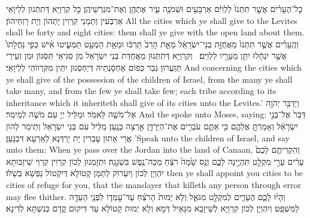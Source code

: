 {כׇּל־הֶעָרִ֗ים אֲשֶׁ֤ר תִּתְּנוּ֙ לַלְוִיִּ֔ם אַרְבָּעִ֥ים וּשְׁמֹנֶ֖ה עִ֑יר אֶתְהֶ֖ן וְאֶת־מִגְרְשֵׁיהֶֽן׃}
{כָּל קִרְוַיָּא דְּתִתְּנוּן לְלֵיוָאֵי אַרְבְּעִין וְתַמְנֵי קִרְוִין יָתְהוֹן וְיָת רַוְחֵיהוֹן׃}
{All the cities which ye shall give to the Levites shall be forty and eight cities: them shall ye give with the open land about them.}{}
{וְהֶֽעָרִ֗ים אֲשֶׁ֤ר תִּתְּנוּ֙ מֵאֲחֻזַּ֣ת בְּנֵי־יִשְׂרָאֵ֔ל מֵאֵ֤ת הָרַב֙ תַּרְבּ֔וּ וּמֵאֵ֥ת הַמְעַ֖ט תַּמְעִ֑יטוּ אִ֗ישׁ כְּפִ֤י נַחֲלָתוֹ֙ אֲשֶׁ֣ר יִנְחָ֔לוּ יִתֵּ֥ן מֵעָרָ֖יו לַלְוִיִּֽם׃ \petucha }
{וְקִרְוַיָּא דְּתִתְּנוּן מֵאֲחֻדַּת בְּנֵי יִשְׂרָאֵל מִן סַגִּיאֵי תַּסְגּוֹן וּמִן זְעֵירֵי תַּזְעֲרוּן גְּבַר כְּפוֹם אַחְסָנְתֵיהּ דְּיַחְסְנוּן יִתֵּין מִקִּרְווֹהִי לְלֵיוָאֵי׃}
{And concerning the cities which ye shall give of the possession of the children of Israel, from the many ye shall take many, and from the few ye shall take few; each tribe according to its inheritance which it inheriteth shall give of its cities unto the Levites.’}{}
{וַיְדַבֵּ֥ר יְהֹוָ֖ה אֶל־מֹשֶׁ֥ה לֵּאמֹֽר׃}
{וּמַלֵּיל יְיָ עִם מֹשֶׁה לְמֵימַר׃}
{And the \lord\space spoke unto Moses, saying:}{}
{דַּבֵּר֙ אֶל־בְּנֵ֣י יִשְׂרָאֵ֔ל וְאָמַרְתָּ֖ אֲלֵהֶ֑ם כִּ֥י אַתֶּ֛ם עֹבְרִ֥ים אֶת־הַיַּרְדֵּ֖ן אַ֥רְצָה כְּנָֽעַן׃}
{מַלֵּיל עִם בְּנֵי יִשְׂרָאֵל וְתֵימַר לְהוֹן אֲרֵי אַתּוּן עָבְרִין יָת יַרְדְּנָא לְאַרְעָא דִּכְנָעַן׃}
{’Speak unto the children of Israel, and say unto them: When ye pass over the Jordan into the land of Canaan,}{}
{וְהִקְרִיתֶ֤ם לָכֶם֙ עָרִ֔ים עָרֵ֥י מִקְלָ֖ט תִּהְיֶ֣ינָה לָכֶ֑ם וְנָ֥ס שָׁ֙מָּה֙ רֹצֵ֔חַ מַכֵּה־נֶ֖פֶשׁ בִּשְׁגָגָֽה׃
}
{וּתְזָמְנוּן לְכוֹן קִרְוִין קִרְוֵי שֵׁיזָבוּתָא יִהְוְיָן לְכוֹן וְיִעְרוֹק לְתַמָּן קָטוֹלָא דְּיִקְטוֹל נַפְשָׁא בְּשָׁלוּ׃}
{then ye shall appoint you cities to be cities of refuge for you, that the manslayer that killeth any person through error may flee thither.}{}
{וְהָי֨וּ לָכֶ֧ם הֶעָרִ֛ים לְמִקְלָ֖ט מִגֹּאֵ֑ל וְלֹ֤א יָמוּת֙ הָרֹצֵ֔חַ עַד־עׇמְד֛וֹ לִפְנֵ֥י הָעֵדָ֖ה לַמִּשְׁפָּֽט׃
}
{וְיִהְוְיָן לְכוֹן קִרְוַיָּא לְשֵׁיזָבָא מִגָּאֵיל דְּמָא וְלָא יְמוּת קָטוֹלָא עַד דִּיקוּם קֳדָם כְּנִשְׁתָּא לְדִינָא׃}
